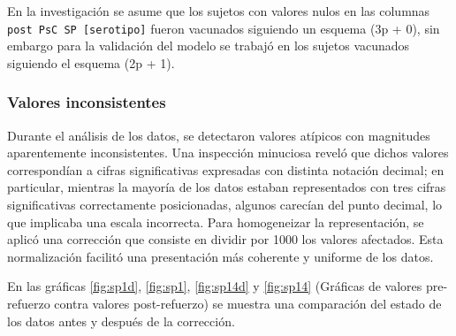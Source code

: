 En la investigación se asume que los sujetos con valores nulos en las columnas \texttt{post PsC SP [serotipo]} fueron vacunados siguiendo un esquema (3p + 0), sin embargo para la validación del modelo se trabajó en los sujetos vacunados siguiendo el esquema (2p + 1).

\subsubsection{Valores inconsistentes}
Durante el análisis de los datos, se detectaron valores atípicos con magnitudes aparentemente inconsistentes. Una inspección minuciosa reveló que dichos valores correspondían a cifras significativas expresadas con distinta notación decimal; en particular, mientras la mayoría de los datos estaban representados con tres cifras significativas correctamente posicionadas, algunos carecían del punto decimal, lo que implicaba una escala incorrecta. Para homogeneizar la representación, se aplicó una corrección que consiste en dividir por 1000 los valores afectados. Esta normalización facilitó una presentación más coherente y uniforme de los datos.

En las gráficas \ref{fig:sp1d}, \ref{fig:sp1}, \ref{fig:sp14d} y \ref{fig:sp14} (Gráficas de valores pre-refuerzo contra valores post-refuerzo) se muestra una comparación del estado de los datos antes y después de la corrección.


